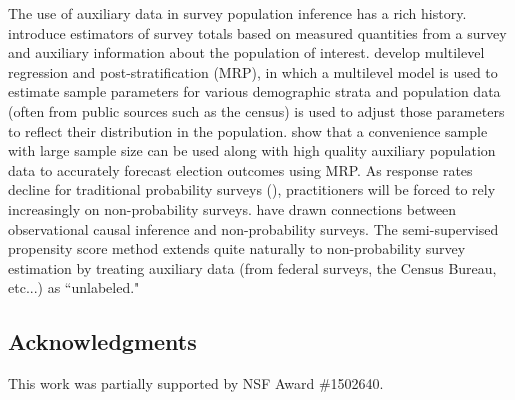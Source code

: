 \documentclass[aos]{imsart}
\begin{document}
The use of auxiliary data in survey population inference has a rich history. \cite{horvitz1952generalization} 
introduce estimators of survey totals based on measured quantities from a survey and auxiliary information about the population of interest.
\cite{GelmanLittle97} develop multilevel regression and post-stratification (MRP), 
in which a multilevel model is used to estimate sample parameters for various demographic strata and population data 
(often from public sources such as the census) is used to adjust those parameters to reflect their distribution in the population. 
\cite{WANG2015980} show that a convenience sample with large sample size can be used along with 
high quality auxiliary population data to accurately forecast election outcomes using MRP. 
As response rates decline for traditional probability surveys (\cite{kennedy2019response}), 
practitioners will be forced to rely increasingly on non-probability surveys.
\cite{mkks2017} have drawn connections between observational causal inference and non-probability surveys. 
The semi-supervised propensity score method extends quite naturally to non-probability survey estimation 
by treating auxiliary data (from federal surveys, the Census Bureau, etc...) as ``unlabeled."

\subsection{Acknowledgments}

This work was partially supported by NSF Award \#1502640.

 


\end{document}
